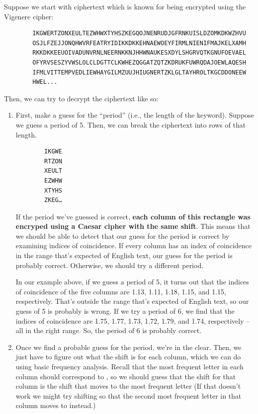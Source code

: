 \documentclass[letterpaper]{article}
\begin{document}
Suppose we start with ciphertext which is known for being encrypted using the Vigenere cipher:
\begin{mdframed}
    \begin{verbatim}
        IKGWERTZONXEULTEZWHWXTYHSZKEGQOJNENRUDJGFRNKUISLDZOMKDKWZHVU
        OSJLFZEJJONQHWVRFEATRYIDIKKDKKEHNAEWOEYFIRMLNIENIFMAJKELXAMH
        RKKDKKEEUOIVADUNVRNLNEERNKKNJHHWNAUKESXDYLSHGRVQTKGNUFOEVAEL
        OFYRVSESZYVWSLOLCLDGTTCLKWHEZQGGATZQTZKDRUKFUWRQDAJOEWLAQESH
        IFMLVITTEMPVEDLIEWHAYGILMZUUJHIUGNERTZKLGLTAYHROLTKGCDDONEEW
        HWEL...\end{verbatim}
\end{mdframed}
Then, we can try to decrypt the ciphertext like so: 
\begin{enumerate}
    \item First, make a guess for the ``period'' (i.e., the length of the keyword). Suppose we guess a period of 5. Then, we can break the ciphertext into rows of that length. 
    \begin{verbatim}
        IKGWE 
        RTZON 
        XEULT 
        EZWHW 
        XTYHS 
        ZKEG…\end{verbatim}

    If the period we've guessed is correct, \textbf{each column of this rectangle was encryped using a Caesar cipher with the same shift}. This means that we should be able to detect that our guess for the period is correct by examining indices of coincidence. If every column has an index of coincidence in the range that's expected of English text, our guess for the period is probably correct. Otherwise, we should try a different period. 

    \bigskip 

    In our example above, if we guess a period of 5, it turns out that the indices of coincidence of the five columns are 1.13, 1.11, 1.18, 1.15, and 1.15, respectively. That's outside the range that's expected of English text, so our guess of 5 is probably is wrong. If we try a period of 6, we find that the indices of coincidence are 1.75, 1.77, 1.73, 1.72, 1.79, and 1.74, respectively -- all in the right range. So, the period of 6 is probably correct. 

    \item Once we find a probable guess for the period, we're in the clear. Then, we just have to figure out what the shift is for each column, which we can do using basic frequency analysis. Recall that the most frequent letter in each column should correspond to , so we should guess that the shift for that column is the shift that moves  to the most frequent letter (If that doesn't work we might try shifting so that the second most frequent letter in that column moves to  instead.)
\end{enumerate}
\end{document}
